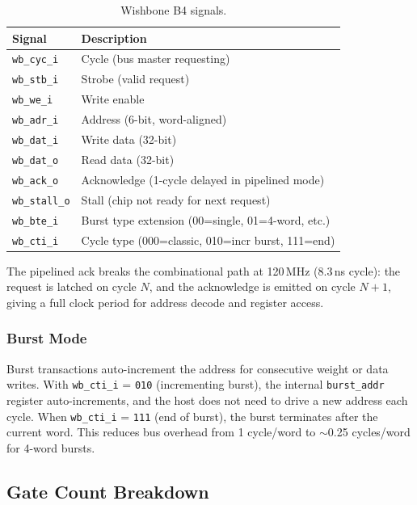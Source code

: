 \documentclass[11pt,a4paper]{article}
\theoremstyle{definition}
\theoremstyle{remark}
\begin{document}
\begin{table}[h]
\centering
\caption{Wishbone B4 signals.}
\label{tab:wishbone}
\begin{tabular}{ll}
\toprule
\textbf{Signal} & \textbf{Description} \\
\midrule
\texttt{wb\_cyc\_i} & Cycle (bus master requesting) \\
\texttt{wb\_stb\_i} & Strobe (valid request) \\
\texttt{wb\_we\_i} & Write enable \\
\texttt{wb\_adr\_i} & Address (6-bit, word-aligned) \\
\texttt{wb\_dat\_i} & Write data (32-bit) \\
\texttt{wb\_dat\_o} & Read data (32-bit) \\
\texttt{wb\_ack\_o} & Acknowledge (1-cycle delayed in pipelined mode) \\
\texttt{wb\_stall\_o} & Stall (chip not ready for next request) \\
\texttt{wb\_bte\_i} & Burst type extension (00=single, 01=4-word, etc.) \\
\texttt{wb\_cti\_i} & Cycle type (000=classic, 010=incr burst, 111=end) \\
\bottomrule
\end{tabular}
\end{table}

The pipelined ack breaks the combinational path at 120\,MHz (8.3\,ns cycle):
the request is latched on cycle $N$, and the acknowledge is emitted on cycle
$N+1$, giving a full clock period for address decode and register access.

\subsubsection{Burst Mode}
Burst transactions auto-increment the address for consecutive weight or data
writes. With \texttt{wb\_cti\_i} = \texttt{010} (incrementing burst), the
internal \texttt{burst\_addr} register auto-increments, and the host does not need
to drive a new address each cycle. When \texttt{wb\_cti\_i} = \texttt{111} (end of
burst), the burst terminates after the current word. This reduces bus overhead
from 1 cycle/word to $\sim$0.25 cycles/word for 4-word bursts.

\subsection{Gate Count Breakdown}
\end{document}
